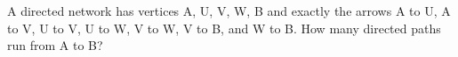 A directed network has vertices A, U, V, W, B and exactly the arrows A to U, A to V, U to V, U to W, V to W, V to B, and W to B. How many directed paths run from A to B?

